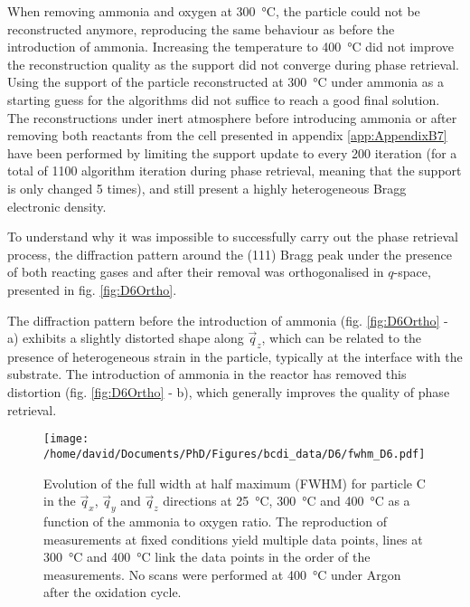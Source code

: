 When removing ammonia and oxygen at \qty{300}{\degreeCelsius}, the particle could not be reconstructed anymore, reproducing the same behaviour as before the introduction of ammonia.
Increasing the temperature to \qty{400}{\degreeCelsius} did not improve the reconstruction quality as the support did not converge during phase retrieval.
Using the support of the particle reconstructed at \qty{300}{\degreeCelsius} under ammonia as a starting guess for the algorithms did not suffice to reach a good final solution.
The reconstructions under inert atmosphere before introducing ammonia or after removing both reactants from the cell presented in appendix \ref{app:AppendixB7} have been performed by limiting the support update to every 200 iteration (for a total of 1100 algorithm iteration during phase retrieval, meaning that the support is only changed 5 times), and still present a highly heterogeneous Bragg electronic density.

To understand why it was impossible to successfully carry out the phase retrieval process, the diffraction pattern around the (111) Bragg peak under the presence of both reacting gases and after their removal was orthogonalised in $q$-space, presented in fig. \ref{fig:D6Ortho}.

The diffraction pattern before the introduction of ammonia (fig. \ref{fig:D6Ortho} - a) exhibits a slightly distorted shape along $\vec{q}_z$, which can be related to the presence of heterogeneous strain in the particle, typically at the interface with the substrate.
The introduction of ammonia in the reactor has removed this distortion (fig. \ref{fig:D6Ortho} - b), which generally improves the quality of phase retrieval.

\begin{figure}[!hbt]
    \centering
    \texttt{[image: /home/david/Documents/PhD/Figures/bcdi\_data/D6/fwhm\_D6.pdf]}
    \caption{
        Evolution of the full width at half maximum (FWHM) for particle C in the $\vec{q}_x$, $\vec{q}_y$ and $\vec{q}_z$ directions at \qty{25}{\degreeCelsius}, \qty{300}{\degreeCelsius} and \qty{400}{\degreeCelsius} as a function of the ammonia to oxygen ratio.
        The reproduction of measurements at fixed conditions yield multiple data points, lines at \qty{300}{\degreeCelsius} and \qty{400}{\degreeCelsius} link the data points in the order of the measurements.
        No scans were performed at \qty{400}{\degreeCelsius} under Argon after the oxidation cycle.
    }
    \label{fig:D6FWHM}
\end{figure}

